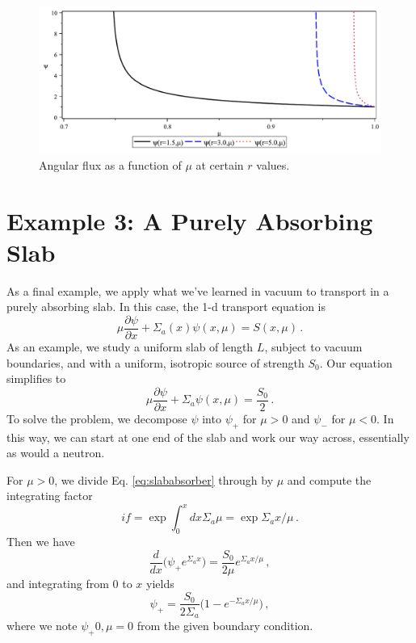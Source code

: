 \begin{figure}[ht] 
    \centering
    \includegraphics[keepaspectratio, width = 5.0 in]{images/sphere_psi_mu}
    \caption{Angular flux as a function of $\mu$ at certain $r$ values.}
    \label{fig:sphere_psi_mu}
\end{figure}

\section*{Example 3: A Purely Absorbing Slab}

As a final example, we apply what we've learned in vacuum to transport in a purely absorbing slab.  In this case, the 1-d transport equation is
\begin{equation}
 \mu \frac{\partial \psi}{\partial x} + \Sigma_a(x)\psi(x,\mu) = S(x,\mu) \, .
\end{equation}
As an example, we study a uniform slab of length $L$, subject to vacuum boundaries, and with a uniform, isotropic source of strength $S_0$.  Our equation simplifies to 
\begin{equation}
 \mu \frac{\partial \psi}{\partial x} + \Sigma_a \psi(x,\mu) = \frac{S_0}{2} \, .
 \label{eq:slababsorber}
\end{equation}
To solve the problem, we decompose $\psi$ into $\psi_+$ for $\mu > 0$ and $\psi_-$ for $\mu < 0$.  In this way, we can start at one end of the slab and work our way across, essentially as would a neutron.

For $\mu>0$, we divide Eq. \ref{eq:slababsorber} through by $\mu$ and compute the integrating factor
\begin{equation}
 if = \exp{\int^x_0 dx \Sigma_a\mu} = \exp{\Sigma_a x/\mu} \, .
\end{equation}
Then we have
\begin{equation}
 \frac{d}{dx}\Big ( \psi_{+} e^{\Sigma_a x} \Big ) = \frac{S_0}{2\mu}  e^{\Sigma_a x/\mu} \, ,
\end{equation}
and integrating from $0$ to $x$ yields
\begin{equation}
 \psi_{+} = \frac{S_0}{2\Sigma_a}\Bigg (1 - e^{-\Sigma_a x/\mu} \Bigg ) \, ,
\end{equation}
where we note $\psi_+{0,\mu} = 0$ from the given boundary condition.

